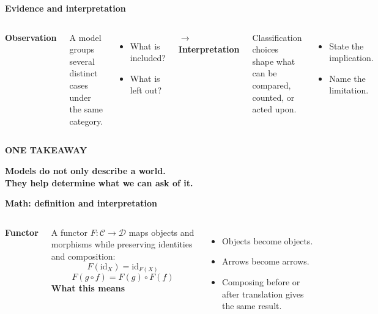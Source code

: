 \documentclass[aspectratio=169]{beamer}
\newcommand{\slideheading}[1]{%
    {\small\bfseries\color{slideMuted}#1\par}
    \vspace{1em}
}
\begin{document}
\begin{frame}
    \slideheading{Evidence and interpretation}
    \begin{columns}[T,onlytextwidth]
        {\large\bfseries\color{slideBlue}Observation}\par
        \vspace{0.5em}
        A model groups several distinct cases under the same category.
        \begin{itemize}
            \item What is included?
            \item What is left out?
        \end{itemize}
        \centering
        {\Large\color{slideBlue}$\rightarrow$}
        {\large\bfseries\color{slideBlue}Interpretation}\par
        \vspace{0.5em}
        Classification choices shape what can be compared, counted, or acted upon.
        \begin{itemize}
            \item State the implication.
            \item Name the limitation.
        \end{itemize}
    \end{columns}
\end{frame}

\begin{frame}
    \centering
    \vfill
    {\color{slideBlue}\small\bfseries ONE TAKEAWAY}\par
    \vspace{1em}
    {\color{slideInk}\LARGE\bfseries
    Models do not only describe a world.\\
    They help determine what we can ask of it.}
    \vfill
\end{frame}

\begin{frame}
    \slideheading{Math: definition and interpretation}
    \begin{columns}[T,onlytextwidth]
        {\large\bfseries\color{slideBlue}Functor}\par
        A functor $F:\mathcal{C}\to\mathcal{D}$ maps objects and
        morphisms while preserving identities and composition:
        \[
            F(\mathrm{id}_X)=\mathrm{id}_{F(X)}
        \]
        \[
            \boxed{F(g\circ f)=F(g)\circ F(f)}
        \]
        {\large\bfseries\color{slideBlue}What this means}\par
        \begin{itemize}
            \item Objects become objects.
            \item Arrows become arrows.
            \item Composing before or after translation gives the same result.
        \end{itemize}
    \end{columns}
\end{frame}
\end{document}
